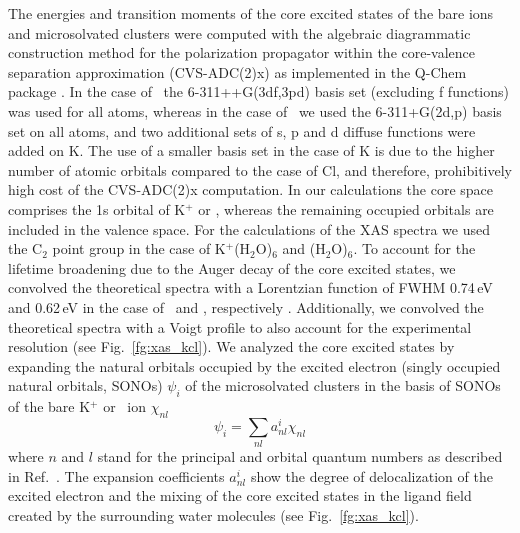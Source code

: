 The energies and transition moments of the core excited states of the bare ions and microsolvated clusters were computed with the algebraic diagrammatic construction method for the polarization propagator \citep{sch82:2395} within the core-valence separation approximation \citep{bar85:867,ced80:206,ced81:1038} (CVS-ADC(2)x) as implemented in the Q-Chem package \citep{Wenzel14:1900,Wenzel14:4583,Wormit14:774,QChem2015}. In the case of \cli~the 6-311++G(3df,3pd) basis set \citep{Krishnan80:650,McLean80:5639} (excluding f functions) was used for all atoms, whereas in the case of \ki~we used the 6-311+G(2d,p) basis set \citep{Krishnan80:650,Blaudeau97:5016} on all atoms, and two additional sets of s, p and d diffuse functions were added on K. The use of a smaller basis set in the case of K is due to the higher number of atomic orbitals compared to the case of Cl, and therefore, prohibitively high cost of the CVS-ADC(2)x computation. In our calculations the core space comprises the 1s orbital of K$^{+}$ or \cli, whereas the remaining occupied orbitals are included in the valence space. For the calculations of the XAS spectra we used the C$_2$ point group in the case of K$^{+}$(H$_2$O)$_6$ and \cli(H$_2$O)$_6$. To account for the lifetime broadening due to the Auger decay of the core excited states, we convolved the theoretical spectra with a Lorentzian function of FWHM 0.74\,eV and 0.62\,eV in the case of \ki~and \cli, respectively \citep{Krause79:329}. Additionally, we convolved the theoretical spectra with a Voigt profile to also account for the experimental resolution (see Fig.\ \ref{fg:xas_kcl}). We analyzed the core excited states by expanding the natural orbitals occupied by the excited electron (singly occupied natural orbitals, SONOs) $\psi_{i}$ of the microsolvated clusters in the basis of SONOs of the bare K$^{+}$ or \cli~ion $\chi_{nl}$
%
\begin{equation}\label{eq:sono_proj}
\psi_{i} = \sum_{nl} a^{i}_{nl} \chi_{nl}
\end{equation}
%
where $n$ and $l$ stand for the principal and orbital quantum numbers as described in Ref.\ \citep{miteva16:16671}. The expansion coefficients $a^{i}_{nl}$ show the degree of delocalization of the excited electron and the mixing of the core excited states in the ligand field created by the surrounding water molecules (see Fig.\ \ref{fg:xas_kcl}).


